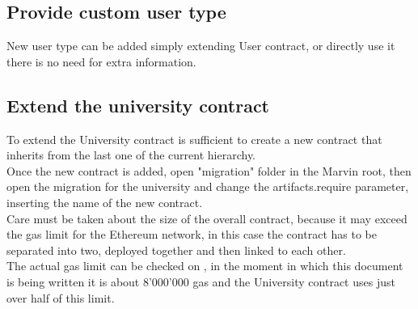 \documentclass[ManualeSviluppatore.tex]{subfiles}
\begin{document}
\subsection{Provide custom user type}
New user type can be added simply extending User contract, or directly use it there is no need for extra information. \\

\subsection{Extend the university contract}
To extend the University contract is sufficient to create a new contract that inherits from the last one of the current hierarchy. \\
Once the new contract is added, open "migration" folder in the Marvin root, then open the migration for the university and change the artifacts.require parameter, inserting the name of the new contract. \\
Care must be taken about the size of the overall contract, because it may exceed the gas limit for the Ethereum network, in this case the contract has to be separated into two, deployed together and then linked to each other. \\
The actual gas limit can be checked on , in the moment in which this document is being written it is about 8'000'000 gas and the University contract uses just over half of this limit. \\
\end{document}
